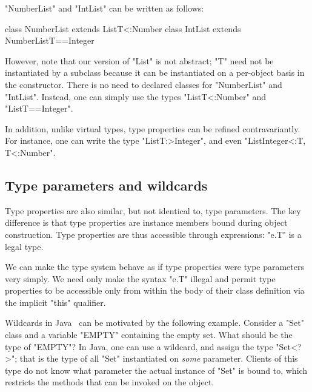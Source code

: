 \noindent
\xcd"NumberList" and \xcd"IntList" can be written as follows:
{\footnotesize
\begin{xten}
class NumberList extends List{T<:Number} { }
class IntList extends NumberList{T==Integer} { }
\end{xten}}

However, note that our version of \xcd"List" is not abstract;
\xcd"T" need not be instantiated by a subclass because it can be
instantiated on a per-object basis in the constructor.
There is no
need to declared classes for \xcd"NumberList" and \xcd"IntList".
Instead, one can simply use the types
\xcd"List{T<:Number}" and \xcd"List{T==Integer}".

In addition,
unlike virtual types, type properties can be refined contravariantly.
For instance, one can write the type \xcd"List{T:>Integer}",
and even \xcd"List{Integer<:T, T<:Number}".

\subsection{Type parameters and wildcards}
\label{sec:parameters-vs-fields}

Type properties are also similar, but not identical to, type
parameters.  The key difference is that type properties are
instance members bound during object construction.  Type
properties are thus accessible through expressions: \xcd"e.T" is
a legal type.

We can make the type system behave as if type properties were
type parameters very simply.  We need only make the syntax \xcd"e.T"
illegal and permit type properties to be accessible only
from within the body of their class definition via the implicit \xcd"this"
qualifier.

Wildcards in Java~\cite{Java3,adding-wildcards} can be motivated
by the following example.
Consider a \xcd"Set" class and a variable \xcd"EMPTY" containing
the empty set.  What should be the type of \xcd"EMPTY"?
In Java, one can use a wildcard, and 
assign the type \xcd"Set<?>"; that is the type of all \xcd"Set"
instantiated on {\em some} parameter.  Clients of this
type do not know what parameter the actual instance of \xcd"Set"
is bound to, which restricts the methods that can be invoked on
the object.

